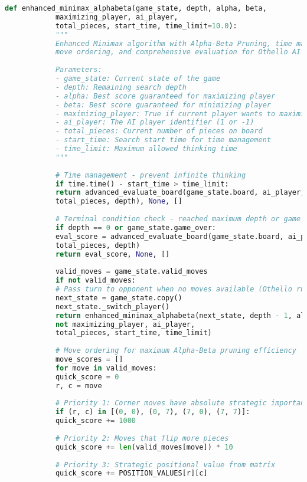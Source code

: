 \documentclass[12pt]{article}
\newenvironment{ltrcode}{\lr\bgroup}{\egroup}
\begin{document}
	\begin{ltrcode}
		\begin{lstlisting}[language=Python, caption=Complete Enhanced Minimax with Alpha-Beta Pruning]
			def enhanced_minimax_alphabeta(game_state, depth, alpha, beta, 
			maximizing_player, ai_player, 
			total_pieces, start_time, time_limit=10.0):
			"""
			Enhanced Minimax algorithm with Alpha-Beta Pruning, time management,
			move ordering, and comprehensive evaluation for Othello AI
			
			Parameters:
			- game_state: Current state of the game
			- depth: Remaining search depth  
			- alpha: Best score guaranteed for maximizing player
			- beta: Best score guaranteed for minimizing player
			- maximizing_player: True if current player wants to maximize score
			- ai_player: The AI player identifier (1 or -1)
			- total_pieces: Current number of pieces on board
			- start_time: Search start time for time management
			- time_limit: Maximum allowed thinking time
			"""
			
			# Time management - prevent infinite thinking
			if time.time() - start_time > time_limit:
			return advanced_evaluate_board(game_state.board, ai_player, 
			total_pieces, depth), None, []
			
			# Terminal condition check - reached maximum depth or game ended
			if depth == 0 or game_state.game_over:
			eval_score = advanced_evaluate_board(game_state.board, ai_player, 
			total_pieces, depth)
			return eval_score, None, []
			
			valid_moves = game_state.valid_moves
			if not valid_moves:
			# Pass turn to opponent when no moves available (Othello rules)
			next_state = game_state.copy()
			next_state._switch_player()
			return enhanced_minimax_alphabeta(next_state, depth - 1, alpha, beta, 
			not maximizing_player, ai_player, 
			total_pieces, start_time, time_limit)
			
			# Move ordering for maximum Alpha-Beta pruning efficiency
			move_scores = []
			for move in valid_moves:
			quick_score = 0
			r, c = move
			
			# Priority 1: Corner moves have absolute strategic importance
			if (r, c) in [(0, 0), (0, 7), (7, 0), (7, 7)]:
			quick_score += 1000
			
			# Priority 2: Moves that flip more pieces
			quick_score += len(valid_moves[move]) * 10
			
			# Priority 3: Strategic positional value from matrix
			quick_score += POSITION_VALUES[r][c]
			

\end{lstlisting}
\end{ltrcode}
\end{document}
